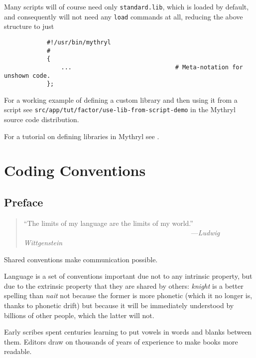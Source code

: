 Many scripts will of course need only {\tt standard.lib}, which is loaded by 
default, and consequently will not need any {\tt load} commands at all, reducing 
the above structure to just

\begin{verbatim}
            #!/usr/bin/mythryl 
            #
            { 
                ...                             # Meta-notation for unshown code.
            }; 
\end{verbatim}


For a working example of defining a custom library and then 
using it from a script see {\tt src/app/tut/factor/use-lib-from-script-demo} in 
the Mythryl source code distribution.

For a tutorial on defining libraries in Mythryl see 
.


\section{Coding Conventions}

\subsection{Preface}

\begin{quote}\begin{tiny}
               ``The limits of my language are the limits of my world.''\newline
               ~~~~~~~~~~~~~~~~~~~~~~~~~~~~~~~~~~~~~~~~~~~~~~~~---{\em Ludwig Wittgenstein}
\end{tiny}\end{quote}

Shared conventions make communication possible.

Language is a set of conventions important due not to any intrinsic 
property, but due to the extrinsic property that they are shared by 
others:  {\em knight} is a better spelling than {\em nait} not because 
the former is more phonetic (which it no longer is, thanks to phonetic 
drift) but because it will be immediately understood by billions of 
other people, which the latter will not.

Early scribes spent centuries learning to put vowels in words 
and blanks between them.  Editors draw on thousands of years of experience 
to make books more readable. 

